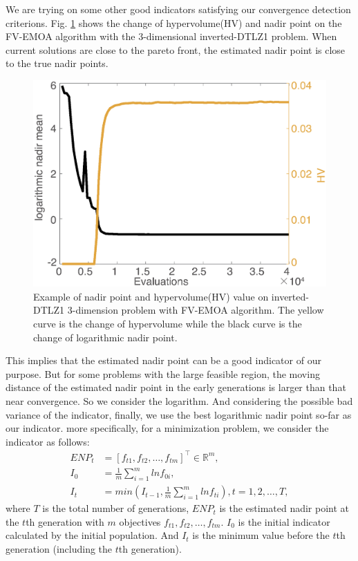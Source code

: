 \documentclass[conference]{IEEEtran}
\begin{document}
We are trying on some other good indicators satisfying our convergence detection criterions. 
Fig. \ref{wcd1} shows the change of hypervolume(HV) and nadir point on the FV-EMOA algorithm 
with the 3-dimensional inverted-DTLZ1 problem.
When current solutions are close to the pareto front, the estimated nadir point is close 
to the true nadir points. 
\begin{figure}[!t]
  \centering
    \includegraphics[width=\columnwidth]{FVEMOA_IDTLZ1_M3_nadir_1}
  \caption{Example of nadir point and hypervolume(HV) value on inverted-DTLZ1 3-dimension problem
  with FV-EMOA algorithm.
  The yellow curve is the change of hypervolume 
  while the black curve is the change of logarithmic nadir point.
  }
  \label{wcd1}
\end{figure}
This implies that the estimated nadir point can be a good indicator of our purpose. 
But for some problems with the large feasible region, 
the moving distance of the estimated nadir point in the early generations is larger than that near convergence.
So we consider the logarithm. And considering the possible bad variance of the indicator, 
finally, we use the best logarithmic nadir point so-far as our indicator. more specifically,
for a minimization problem, we consider the indicator as follows:
\begin{equation}\begin{aligned}\label{ewcd1}
  ENP_{t} &= [f_{t1},f_{t2},\dots,f_{tm}]^\top \in \mathbb{R}^m ,\\
  I_{0} &= \frac{1}{m} \sum_{i=1}^{m}lnf_{0i},\\
  I_{t} &= min(I_{t-1},\frac{1}{m} \sum_{i=1}^{m}lnf_{ti}),
  t = 1,2,\dots,T,
\end{aligned}
\end{equation}
where $T$ is the total number of generations, 
$ENP_{t}$ is the estimated nadir point at the $t$th generation with $m$ objectives $f_{t1},f_{t2},\dots,f_{tm}$. 
$I_0$ is the initial indicator calculated by the initial population.
And $I_t$ is the minimum value before the $t$th generation (including the $t$th generation). 
\end{document}
